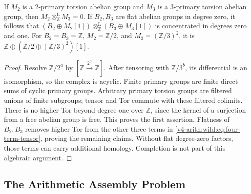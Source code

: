 \begin{lemma}
\label{v4-arith:wild:distinct-primary}
If \(M_2\) is a \(2\)-primary torsion abelian group and \(M_3\)
is a \(3\)-primary torsion abelian group, then
\(M_2\otimes_{\mathbb Z}^{\mathrm L}M_3=0\).
If \(B_2,B_3\) are flat abelian groups in degree zero, it follows that
\((B_2\oplus M_2[1])\otimes_{\mathbb Z}^{\mathrm L}
 (B_3\oplus M_3[1])\) is concentrated in degrees zero and one.
For \(B_2=B_3=\mathbb Z\), \(M_2=\mathbb Z/2\), and
\(M_3=(\mathbb Z/3)^2\), it is
\(\mathbb Z\oplus(\mathbb Z/2\oplus(\mathbb Z/3)^2)[1]\).
\end{lemma}
\begin{proof}
Resolve \(\mathbb Z/2^a\) by
\([\mathbb Z\xrightarrow{2^a}\mathbb Z]\).
After tensoring with \(\mathbb Z/3^b\), its differential is an
isomorphism, so the complex is acyclic. Finite primary groups
are finite direct sums of cyclic primary groups. Arbitrary primary
torsion groups are filtered unions of finite subgroups; tensor and
Tor commute with these filtered colimits. There is no higher Tor
beyond degree one over \(\mathbb Z\), since the kernel of a
surjection from a free abelian group is free.
This proves the first assertion. Flatness of \(B_2,B_3\) removes
higher Tor from the other three terms in
\eqref{v4-arith:wild:eq:four-term-tensor}, proving the remaining claims.
Without flat degree-zero factors, those terms can carry additional
homology. Completion is not part of this algebraic argument.
\end{proof}

\subsection{The Arithmetic Assembly Problem}

